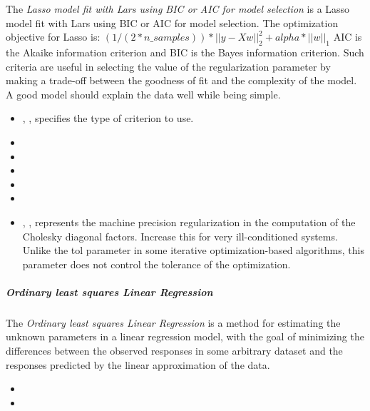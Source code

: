 The \textit{Lasso model fit with Lars using BIC or AIC for model selection} is
a Lasso model fit with Lars using BIC or AIC for model selection. 
The optimization objective for Lasso is:
$(1 / (2 * n\_samples)) * ||y - Xw||^2_2 + alpha * ||w||_1$
AIC is the Akaike information criterion and BIC is the Bayes information
criterion.
%
Such criteria are useful in selecting the value of the regularization parameter
by making a trade-off between the goodness of fit and the complexity of the
model.
%
A good model should explain the data well while being simple.
%
\begin{itemize}
  \item {} , , specifies the type of
  criterion to use.
  \item {}
  \item \verDescriptionB
  \item {}
  \item \precomputeDescription{}
  \item \maxIterDescription{}
  \item {} , , represents the machine
  precision regularization in the computation of the Cholesky diagonal factors.
  Increase this for very ill-conditioned systems.
  Unlike the tol parameter in some iterative optimization-based algorithms, this
  parameter does not control the tolerance of the optimization.
\end{itemize}

\subparagraph{Ordinary least squares Linear Regression}
\mbox{}

The \textit{Ordinary least squares Linear Regression} is a method for
estimating the unknown parameters in a linear regression model, with the goal of
minimizing the differences between the observed responses in some arbitrary
dataset and the responses predicted by the linear approximation of the data.
%

\begin{itemize}
  \item {}
  \item {}
\end{itemize}

